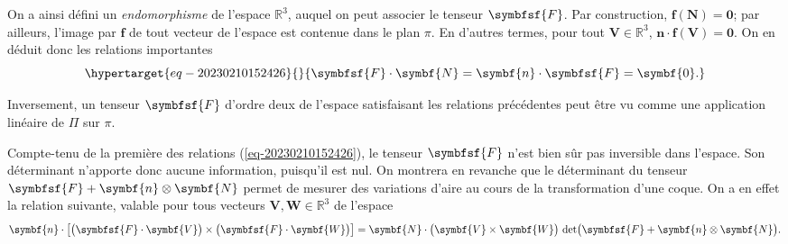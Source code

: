 \documentclass[
  a4paper,
  DIV=11,
  numbers=noendperiod]{scrreprt}
\newcommand{\reals}{\mathbb R}
\newcommand{\tens}[1]{\symbfsf{#1}}
\renewcommand{\vec}[1]{\symbf{#1}}
\begin{document}
On a ainsi défini un \emph{endomorphisme} de l'espace \(\reals^3\),
auquel on peut associer le tenseur \(\tens F\). Par construction,
\(\vec{f}(\vec{N}) = \vec{0}\); par ailleurs, l'image par \(\vec{f}\) de
tout vecteur de l'espace est contenue dans le plan \(\pi\). En d'autres
termes, pour tout \(\vec{V} \in \reals^3\),
\(\vec{n} \cdot \vec{f}(\vec V) = \vec{0}\). On en déduit donc les
relations importantes
\begin{equation}\protect\hypertarget{eq-20230210152426}{}{
\tens F \cdot \vec N = \vec n \cdot \tens F = \vec 0.
}\label{eq-20230210152426}\end{equation}

Inversement, un tenseur \(\tens F\) d'ordre deux de l'espace
satisfaisant les relations précédentes peut être vu comme une
application linéaire de \(\Pi\) sur \(\pi\).

Compte-tenu de la première des relations (\ref{eq-20230210152426}), le
tenseur \(\tens F\) n'est bien sûr pas inversible dans l'espace. Son
déterminant n'apporte donc aucune information, puisqu'il est nul. On
montrera en revanche que le déterminant du tenseur
\(\tens F + \vec n \otimes \vec N\) permet de mesurer des variations
d'aire au cours de la transformation d'une coque. On a en effet la
relation suivante, valable pour tous vecteurs
\(\vec{V}, \vec{W} \in \reals^3\) de l'espace \[
\vec n \cdot \bigl[ \bigl( \tens F \cdot \vec V \bigr) \times \bigl( \tens F \cdot \vec W \bigr) \bigr]
= \vec N \cdot \bigl( \vec V \times \vec W \bigr) \, \det\bigl( \tens F + \vec n \otimes \vec N \bigr).
\]
\end{document}
